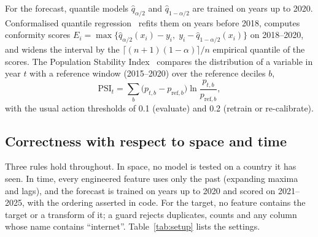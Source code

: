 \documentclass[conference,a4paper]{IEEEtran}
\begin{document}
For the forecast, quantile models $\hat q_{\alpha/2}$ and $\hat q_{1-\alpha/2}$ are trained on years
up to 2020. Conformalised quantile regression~\cite{romano2019cqr} refits them on years before 2018,
computes conformity scores $E_i=\max\{\hat q_{\alpha/2}(x_i)-y_i,\;y_i-\hat q_{1-\alpha/2}(x_i)\}$
on 2018--2020, and widens the interval by the $\lceil(n+1)(1-\alpha)\rceil/n$ empirical quantile of
the scores. The Population Stability Index~\cite{siddiqi2006} compares the distribution of a variable
in year $t$ with a reference window (2015--2020) over the reference deciles $b$,
\begin{equation}
\mathrm{PSI}_t=\sum_{b}\big(p_{t,b}-p_{\mathrm{ref},b}\big)\ln\frac{p_{t,b}}{p_{\mathrm{ref},b}},
\end{equation}
with the usual action thresholds of 0.1 (evaluate) and 0.2 (retrain or re-calibrate).

\subsection{Correctness with respect to space and time}
Three rules hold throughout. In space, no model is tested on a country it has seen. In time, every
engineered feature uses only the past (expanding maxima and lags), and the forecast is trained on
years up to 2020 and scored on 2021--2025, with the ordering asserted in code. For the target, no
feature contains the target or a transform of it; a guard rejects duplicates, counts and any column
whose name contains ``internet''. Table~\ref{tab:setup} lists the settings.
\end{document}
